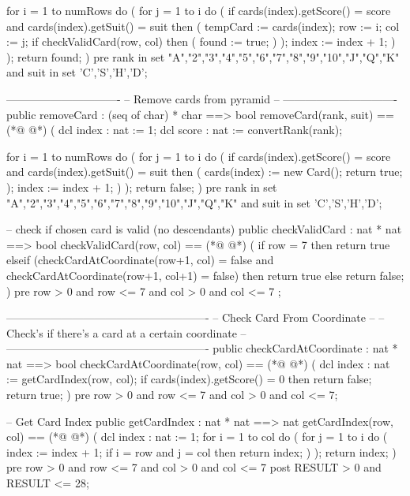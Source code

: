 \begin{vdmpp}[breaklines=true]
    for i = 1 to numRows do
    (
     for j = 1 to i do
     (
      if cards(index).getScore() = score and cards(index).getSuit() = suit then
      (
       tempCard := cards(index);
        row := i;
        col := j;
       if checkValidCard(row, col) then
       ( 
        found := true;
       )
       );
       index := index + 1;
     )
    );
    return found;
   )
   pre rank in set {"A","2","3","4","5","6","7","8","9","10","J","Q","K"}
    and suit in set {'C','S','H','D'};
  
  -------------------------------
  -- Remove cards from pyramid --
  -------------------------------
  public removeCard : (seq of char) * char ==> bool
   removeCard(rank, suit)  == 
(*@
\label{removeCard:120}
@*)
   (
    dcl index : nat := 1;
    dcl score : nat := convertRank(rank);
    
    for i = 1 to numRows do
    (
     for j = 1 to i do
     (
      if cards(index).getScore() = score and cards(index).getSuit() = suit then
      (
       cards(index) := new Card();
       return true;
      );
       index := index + 1;
     )
    );
    return false;
   )
   pre rank in set {"A","2","3","4","5","6","7","8","9","10","J","Q","K"}
    and suit in set {'C','S','H','D'};
   
  
   
   
   -- check if chosen card is valid (no descendants)
   public checkValidCard : nat * nat ==> bool 
   checkValidCard(row, col) ==
(*@
\label{checkValidCard:147}
@*)
   (
    if row = 7 then return true
    elseif (checkCardAtCoordinate(row+1, col) = false and checkCardAtCoordinate(row+1, col+1) = false) then return true
    else return false;
   )
   pre row > 0 and row <= 7 and col > 0 and col <= 7 ;
  
  -------------------------------------------------------
  -- Check Card From Coordinate                        --
  -- Check's if there's a card at a certain coordinate --
  -------------------------------------------------------
  public checkCardAtCoordinate : nat * nat ==> bool
  checkCardAtCoordinate(row, col) == 
(*@
\label{checkCardAtCoordinate:160}
@*)
  (
   dcl index : nat := getCardIndex(row, col);
   if cards(index).getScore() = 0 then return false;
   return true;
  )
  pre row > 0 and row <= 7 and col > 0 and col <= 7;
  
  
  -- Get Card Index
  public getCardIndex : nat * nat ==> nat
  getCardIndex(row, col) ==
(*@
\label{getCardIndex:171}
@*)
  (
   dcl index : nat := 1;
   for i = 1 to col do
   (
    for j = 1 to i do
    (
     index := index + 1;
     if i = row and j = col then return index;
    )
   );
   return index;
  )
  pre row > 0 and row <= 7 and col > 0 and col <= 7
  post RESULT > 0 and RESULT <= 28;
  

\end{vdmpp}
